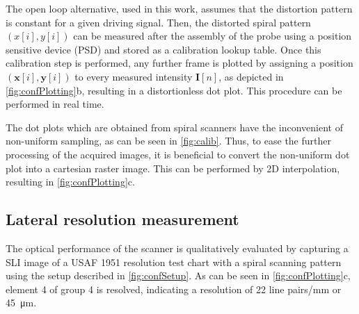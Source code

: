 \documentclass[10pt]{iopart}
\begin{document}
The open loop alternative, used in this work, assumes that the distortion pattern is constant for a given driving signal. Then, the distorted spiral pattern $(x[i], y[i])$ can be measured after the assembly of the probe using a position sensitive device (PSD) and stored as a calibration lookup table.
Once this calibration step is performed, any further frame is plotted by assigning a position $(\mathbf{x}[i], \mathbf{y}[i])$ to every measured intensity $\mathbf{I}[n]$, as depicted in \autoref{fig:confPlotting}b, resulting in a distortionless dot plot. This procedure can be performed in real time.

The dot plots which are obtained from spiral scanners have the inconvenient of non-uniform sampling, as can be seen in \autoref{fig:calib}. Thus, to ease the further processing of the acquired images, it is beneficial to convert the non-uniform dot plot into a cartesian raster image. This can be performed by 2D interpolation, resulting in \autoref{fig:confPlotting}c.


\subsection{Lateral resolution measurement}
The optical performance of the scanner is qualitatively evaluated by capturing a SLI image of a USAF 1951 resolution test chart with a spiral scanning pattern using the setup described in \autoref{fig:confSetup}. As can be seen in \autoref{fig:confPlotting}c, element 4 of group 4 is resolved, indicating a resolution of 22 line pairs/mm or \SI{45}{\micro\meter}. 
\end{document}
